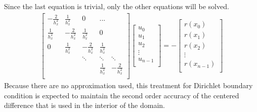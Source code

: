 \documentclass[11pt, letterpaper, hidelinks]{article}
\theoremstyle{definition}
\begin{document}
Since the last equation is trivial, only the other equations will be solved.
\begin{align*}
    \left[
        \begin{array}{ccccc}
            -\frac{2}{h_x^2} & \frac{1}{h_x^2}  & 0                & ...             &                  \\
            \frac{1}{h_x^2}  & -\frac{2}{h_x^2} & \frac{1}{h_x^2}  & 0               &                  \\
            0                & \frac{1}{h_x^2}  & -\frac{2}{h_x^2} & \frac{1}{h_x^2} &                  \\
                             &                  & \ddots           & \ddots          & \ddots           \\
                             &                  &                  & \frac{1}{h_x^2} & -\frac{2}{h_x^2} \\
        \end{array}
        \right]
    \left[
        \begin{array}{ccccc}
            u_0 \\ u_1 \\ u_2 \\ \vdots \\ u_{n-1}  \\
        \end{array}
        \right]
    = -
    \left[
        \begin{array}{ccccc}
            r(x_0) \\ r(x_1) \\ r(x_2) \\ \vdots \\ r(x_{n-1})  \\
        \end{array}
        \right]
\end{align*}
Because there are no approximation used, this treatment for Dirichlet boundary condition is expected to maintain the second order accuracy of the centered difference that is used in the interior of the domain.
\end{document}
